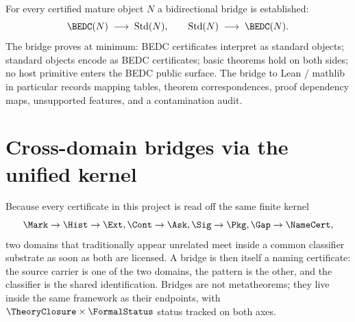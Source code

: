 For every certified mature object $N$ a bidirectional bridge is established:
$$
\BEDC(N) \;\longrightarrow\; \mathrm{Std}(N),
\qquad
\mathrm{Std}(N) \;\longrightarrow\; \BEDC(N).
$$
The bridge proves at minimum: BEDC certificates interpret as standard objects; standard objects encode as BEDC certificates; basic theorems hold on both sides; no host primitive enters the BEDC public surface. The bridge to Lean / mathlib in particular records mapping tables, theorem correspondences, proof dependency maps, unsupported features, and a contamination audit.

\section{Cross-domain bridges via the unified kernel}
\label{sec:roadmap-cross-domain-bridges}

Because every certificate in this project is read off the same finite kernel
$$\Mark \to \Hist \to \Ext, \Cont \to \Ask, \Sig \to \Pkg, \Gap \to \NameCert,$$
two domains that traditionally appear unrelated meet inside a common classifier substrate as soon as both are licensed. A bridge is then itself a naming certificate: the source carrier is one of the two domains, the pattern is the other, and the classifier is the shared identification. Bridges are not metatheorems; they live inside the same framework as their endpoints, with $\TheoryClosure \times \FormalStatus$ status tracked on both axes.

